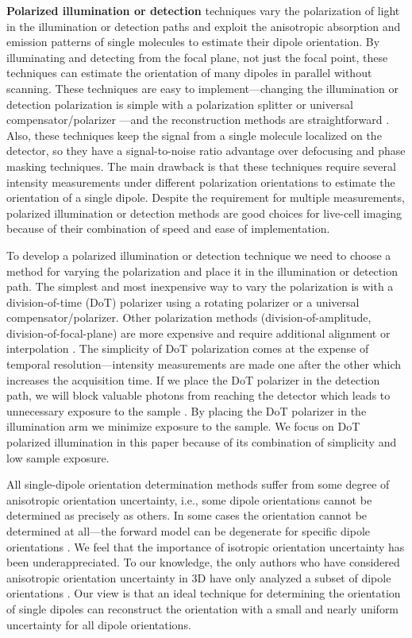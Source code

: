 \documentclass[10pt]{article}
\begin{document}
\textbf{Polarized illumination or detection} techniques vary the polarization of
light in the illumination or detection paths and exploit the anisotropic
absorption and emission patterns of single molecules to estimate their dipole
orientation. By illuminating and detecting from the focal plane, not just the
focal point, these techniques can estimate the orientation of many dipoles in
parallel without scanning. These techniques are easy to implement---changing the
illumination or detection polarization is simple with a polarization splitter
\cite{mehta2016} or universal compensator/polarizer \cite{shribak2003}---and the
reconstruction methods are straightforward \cite{fourkas2001, mehta2016,
  backer2016}. Also, these techniques keep the signal from a single molecule
localized on the detector, so they have a signal-to-noise ratio advantage over
defocusing and phase masking techniques. The main drawback is that these
techniques require several intensity measurements under different polarization
orientations to estimate the orientation of a single dipole. Despite the
requirement for multiple measurements, polarized illumination or detection
methods are good choices for live-cell imaging because of their combination of
speed and ease of implementation.

To develop a polarized illumination or detection technique we need to choose a
method for varying the polarization and place it in the illumination or
detection path. The simplest and most inexpensive way to vary the polarization
is with a division-of-time (DoT) polarizer using a rotating polarizer or a
universal compensator/polarizer. Other polarization methods
(division-of-amplitude, division-of-focal-plane) are more expensive and require
additional alignment or interpolation \cite{tyo2006}. The simplicity of DoT
polarization comes at the expense of temporal resolution---intensity
measurements are made one after the other which increases the acquisition
time. If we place the DoT polarizer in the detection path, we will block
valuable photons from reaching the detector which leads to unnecessary exposure
to the sample \cite{demay2011}. By placing the DoT polarizer in the illumination
arm we minimize exposure to the sample. We focus on DoT polarized illumination
in this paper because of its combination of simplicity and low sample exposure.

All single-dipole orientation determination methods suffer from some degree of
anisotropic orientation uncertainty, i.e., some dipole orientations cannot be
determined as precisely as others. In some cases the orientation cannot be
determined at all---the forward model can be degenerate for specific dipole
orientations \cite{fourkas2001, lu2008}. We feel that the importance of
isotropic orientation uncertainty has been underappreciated. To our knowledge,
the only authors who have considered anisotropic orientation uncertainty in 3D
have only analyzed a subset of dipole orientations \cite{agrawal2012}. Our view
is that an ideal technique for determining the orientation of single dipoles can
reconstruct the orientation with a small and nearly uniform uncertainty for all
dipole orientations.
\end{document}
